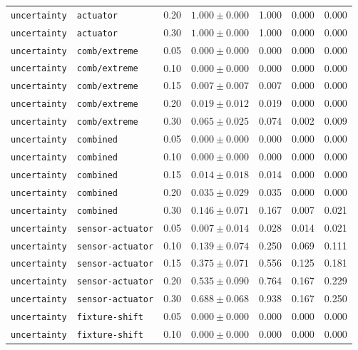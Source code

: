 \documentclass{article}
\begin{document}
\begin{center}
\begin{tabular}{lllcccc}
\texttt{uncertainty} & \texttt{actuator} & 0.20 & $1.000 \pm 0.000$ & 1.000 & 0.000 & 0.000 \\
\texttt{uncertainty} & \texttt{actuator} & 0.30 & $1.000 \pm 0.000$ & 1.000 & 0.000 & 0.000 \\
\texttt{uncertainty} & \texttt{comb/extreme} & 0.05 & $0.000 \pm 0.000$ & 0.000 & 0.000 & 0.000 \\
\texttt{uncertainty} & \texttt{comb/extreme} & 0.10 & $0.000 \pm 0.000$ & 0.000 & 0.000 & 0.000 \\
\texttt{uncertainty} & \texttt{comb/extreme} & 0.15 & $0.007 \pm 0.007$ & 0.007 & 0.000 & 0.000 \\
\texttt{uncertainty} & \texttt{comb/extreme} & 0.20 & $0.019 \pm 0.012$ & 0.019 & 0.000 & 0.000 \\
\texttt{uncertainty} & \texttt{comb/extreme} & 0.30 & $0.065 \pm 0.025$ & 0.074 & 0.002 & 0.009 \\
\texttt{uncertainty} & \texttt{combined} & 0.05 & $0.000 \pm 0.000$ & 0.000 & 0.000 & 0.000 \\
\texttt{uncertainty} & \texttt{combined} & 0.10 & $0.000 \pm 0.000$ & 0.000 & 0.000 & 0.000 \\
\texttt{uncertainty} & \texttt{combined} & 0.15 & $0.014 \pm 0.018$ & 0.014 & 0.000 & 0.000 \\
\texttt{uncertainty} & \texttt{combined} & 0.20 & $0.035 \pm 0.029$ & 0.035 & 0.000 & 0.000 \\
\texttt{uncertainty} & \texttt{combined} & 0.30 & $0.146 \pm 0.071$ & 0.167 & 0.007 & 0.021 \\
\texttt{uncertainty} & \texttt{sensor-actuator} & 0.05 & $0.007 \pm 0.014$ & 0.028 & 0.014 & 0.021 \\
\texttt{uncertainty} & \texttt{sensor-actuator} & 0.10 & $0.139 \pm 0.074$ & 0.250 & 0.069 & 0.111 \\
\texttt{uncertainty} & \texttt{sensor-actuator} & 0.15 & $0.375 \pm 0.071$ & 0.556 & 0.125 & 0.181 \\
\texttt{uncertainty} & \texttt{sensor-actuator} & 0.20 & $0.535 \pm 0.090$ & 0.764 & 0.167 & 0.229 \\
\texttt{uncertainty} & \texttt{sensor-actuator} & 0.30 & $0.688 \pm 0.068$ & 0.938 & 0.167 & 0.250 \\
\texttt{uncertainty} & \texttt{fixture-shift} & 0.05 & $0.000 \pm 0.000$ & 0.000 & 0.000 & 0.000 \\
\texttt{uncertainty} & \texttt{fixture-shift} & 0.10 & $0.000 \pm 0.000$ & 0.000 & 0.000 & 0.000 \\

\end{tabular}
\end{center}
\end{document}
